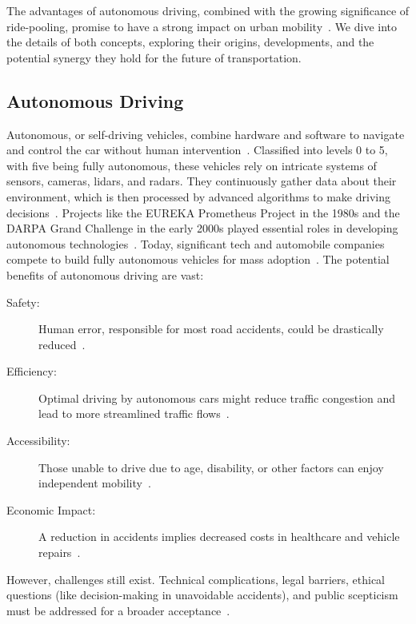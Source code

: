  The advantages of autonomous driving, combined with the growing significance of ride-pooling, promise to have a strong impact on urban mobility~\cite{Stamadianos.2023}. We dive into the details of both concepts, exploring their origins, developments, and the potential synergy they hold for the future of transportation.

\subsection{Autonomous Driving}
Autonomous, or self-driving vehicles, combine hardware and software to navigate and control the car without human intervention~\cite{Stamadianos.2023}. Classified into levels 0 to 5, with five being fully autonomous, these vehicles rely on intricate systems of sensors, cameras, lidars, and radars. They continuously gather data about their environment, which is then processed by advanced algorithms to make driving decisions~\cite{Hacohen.2022}.
Projects like the EUREKA Prometheus Project in the 1980s and the DARPA Grand Challenge in the early 2000s played essential roles in developing autonomous technologies~\cite{Hacohen.2022}. Today, significant tech and automobile companies compete to build fully autonomous vehicles for mass adoption~\cite{Stamadianos.2023}.
The potential benefits of autonomous driving are vast:
\begin{description}
    \item[Safety:] Human error, responsible for most road accidents, could be drastically reduced~\cite{Hacohen.2022}.
    \item[Efficiency:] Optimal driving by autonomous cars might reduce traffic congestion and lead to more streamlined traffic flows~\cite{Stamadianos.2023}.
    \item[Accessibility:] Those unable to drive due to age, disability, or other factors can enjoy independent mobility~\cite{Hacohen.2022}.
    \item[Economic Impact:] A reduction in accidents implies decreased costs in healthcare and vehicle repairs~\cite{Stamadianos.2023}.
\end{description}

However, challenges still exist. Technical complications, legal barriers, ethical questions (like decision-making in unavoidable accidents), and public scepticism must be addressed for a broader acceptance~\cite{Hacohen.2022}.

